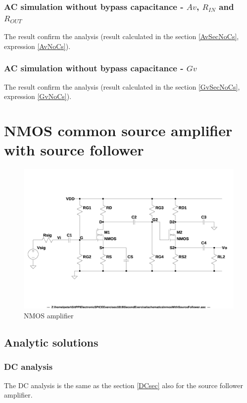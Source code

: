 \documentclass[10pt,a4paper]{book}
\begin{document}
\subsection{AC simulation without bypass capacitance - $Av$, $R_{IN}$ and $R_{OUT}$}

The result confirm the analysis (result calculated in the section \ref{AvSecNoCs}, expression \ref{AvNoCs}).


\subsection{AC simulation without bypass capacitance - $Gv$}

The result confirm the analysis (result calculated in the section \ref{GvSecNoCs}, expression \ref{GvNoCs}).


\chapter{NMOS common source amplifier with source follower}
\begin{figure}[h]
  \centering
  \includegraphics[width=16cm]{schematics/nmosWithSourceFollower.jpg}
  \caption{NMOS amplifier}
  \label{NMOS common source amplifier with source follower}
\end{figure}
\section{Analytic solutions}
\subsection{DC analysis}\label{SFDC}
The DC analysis is the same as the section \ref{DCsec} also for the source follower amplifier.\par
\end{document}
